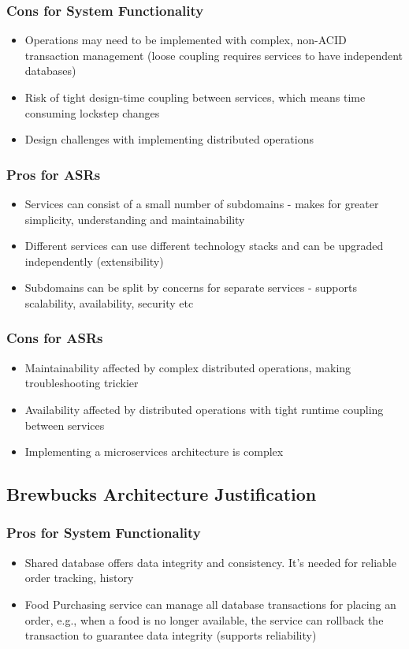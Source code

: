 \documentclass{article}
\begin{document}
\subsubsection*{Cons for System Functionality}
\begin{itemize}
    \item Operations may need to be implemented with complex, non-ACID transaction management (loose coupling requires services to have independent databases)
    \item Risk of tight design-time coupling between services, which means time consuming lockstep changes
    \item Design challenges with implementing distributed operations
\end{itemize}

\subsubsection*{Pros for ASRs}
\begin{itemize}
    \item Services can consist of a small number of subdomains - makes for greater simplicity, understanding and maintainability
    \item Different services can use different technology stacks and can be upgraded independently (extensibility)
    \item Subdomains can be split by concerns for separate services - supports scalability, availability, security etc
\end{itemize}
\subsubsection*{Cons for ASRs}
\begin{itemize}
    \item Maintainability affected by complex distributed operations, making troubleshooting trickier
    \item Availability affected by distributed operations with tight runtime coupling between services
    \item Implementing a microservices architecture is complex
\end{itemize}

\subsection{Brewbucks Architecture Justification}
\subsubsection*{Pros for System Functionality}
\begin{itemize}
    \item Shared database offers data integrity and consistency. It's needed for reliable order tracking, history
    \item Food Purchasing service can manage all database transactions for placing an order, e.g., when a food is no longer available, the service can rollback the transaction to guarantee data integrity (supports reliability)
\end{itemize}
\end{document}
